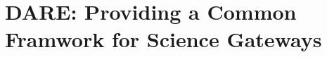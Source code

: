 \documentclass[]{svjour3}
\begin{document}







\section{DARE: Providing a Common Framwork for Science Gateways}
\end{document}
